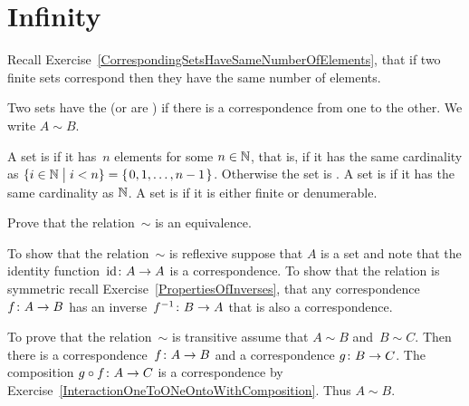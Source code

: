 \chapter{Infinity}

Recall Exercise~\ref{CorrespondingSetsHaveSameNumberOfElements},
that if two finite sets correspond then they have the same number of elements.

\begin{df}
Two sets have the  
(or are ) if there is a 
correspondence from one to the other.
We write $A\sim B$.   
\end{df}

\begin{df}
A set is  if it has~$n$ elements for some $n\in\mathbb{N}$,
that is, if it has the same cardinality as 
$\{i\in\mathbb{N} \bigm| i< n\}=\mbox{$\{\hspace{0.1em}0,1,\ldots,n-1\hspace{0.1em}\}$}$.
Otherwise the set is .   
A set is  if it has the same cardinality 
as $\mathbb{N}$.
A set is  if it is either finite or denumerable.
\end{df}

\begin{problem} \label{ex:EquinumeruousIsEquivalence}
Prove that the relation~$\sim$ is an equivalence.
\begin{answer}
  To show that the relation~$\sim$ is reflexive 
  suppose that $A$ is a set and note that the 
  identity function~$\mbox{$\operatorname{id}\colon A\to A$}$ is a correspondence.
  To show that the relation is symmetric recall 
  Exercise~\ref{PropertiesOfInverses}, that
  any correspondence~$\mbox{$f\colon A\to B$}$ has an inverse~$\mbox{$f^{-1}\colon B\to A$}$
  that is also a correspondence.

  To prove that the relation~$\sim$ is transitive assume that 
  $A\sim B$ and~$B\sim C$.
  Then there is a correspondence~$\mbox{$f\colon A\to B$}$ and a 
  correspondence $\mbox{$g\colon B\to C$}$.
  The composition $\mbox{$g\mathbin{\circ} f\colon A\to C$}$ is a correspondence
  by Exercise~\ref{InteractionOneToONeOntoWithComposition}.
  Thus $A\sim B$.
\end{answer}
\end{problem}

